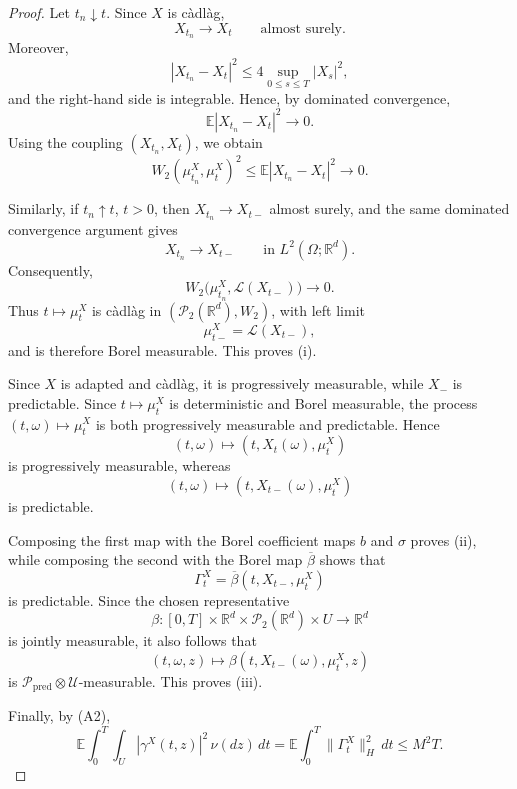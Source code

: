 \documentclass[12pt,oneside, reqno]{amsart}
\numberwithin{equation}{section}
\begin{document}
	\begin{proof}
		Let \(t_n\downarrow t\). Since \(X\) is c\`adl\`ag,
		\[
		X_{t_n}\longrightarrow X_t
		\qquad\text{almost surely}.
		\]
		Moreover,
		\[
		|X_{t_n}-X_t|^2
		\leq
		4\sup_{0\leq s\leq T}|X_s|^2,
		\]
		and the right-hand side is integrable. Hence, by dominated
		convergence,
		\[
		\mathbb E|X_{t_n}-X_t|^2\longrightarrow0.
		\]
		Using the coupling \((X_{t_n},X_t)\), we obtain
		\[
		W_2(\mu_{t_n}^X,\mu_t^X)^2
		\leq
		\mathbb E|X_{t_n}-X_t|^2
		\longrightarrow0.
		\]
		
		Similarly, if \(t_n\uparrow t\), \(t>0\), then
		\(X_{t_n}\to X_{t-}\) almost surely, and the same dominated
		convergence argument gives
		\[
		X_{t_n}\longrightarrow X_{t-}
		\qquad\text{in }L^2(\Omega;\mathbb R^d).
		\]
		Consequently,
		\[
		W_2\bigl(\mu_{t_n}^X,\mathcal L(X_{t-})\bigr)
		\longrightarrow0.
		\]
		Thus \(t\mapsto\mu_t^X\) is c\`adl\`ag in
		\((\mathcal P_2(\mathbb R^d),W_2)\), with left limit
		\[
		\mu_{t-}^X=\mathcal L(X_{t-}),
		\]
		and is therefore Borel measurable. This proves
		\textnormal{(i)}.
		
		Since \(X\) is adapted and c\`adl\`ag, it is progressively
		measurable, while \(X_-\) is predictable. Since
		\(t\mapsto\mu_t^X\) is deterministic and Borel measurable, the
		process \((t,\omega)\mapsto\mu_t^X\) is both progressively
		measurable and predictable. Hence
		\[
		(t,\omega)\longmapsto
		(t,X_t(\omega),\mu_t^X)
		\]
		is progressively measurable, whereas
		\[
		(t,\omega)\longmapsto
		(t,X_{t-}(\omega),\mu_t^X)
		\]
		is predictable.
		
		Composing the first map with the Borel coefficient maps \(b\) and
		\(\sigma\) proves \textnormal{(ii)}, while composing the second with
		the Borel map \(\overline\beta\) shows that
		\[
		\Gamma_t^X
		=
		\overline\beta(t,X_{t-},\mu_t^X)
		\]
		is predictable. Since the chosen representative
		\[
		\beta:
		[0,T]\times\mathbb R^d\times
		\mathcal P_2(\mathbb R^d)\times U
		\longrightarrow\mathbb R^d
		\]
		is jointly measurable, it also follows that
		\[
		(t,\omega,z)
		\longmapsto
		\beta(t,X_{t-}(\omega),\mu_t^X,z)
		\]
		is
		\(\mathcal P_{\mathrm{pred}}\otimes\mathcal U\)-measurable.
		This proves \textnormal{(iii)}.
		
		Finally, by \textnormal{(A2)},
		\[
		\mathbb E\int_0^T\int_U
		|\gamma^X(t,z)|^2\,\nu(dz)\,dt
		=
		\mathbb E\int_0^T
		\|\Gamma_t^X\|_H^2\,dt
		\leq M^2T.
		\]
	\end{proof}
	
\end{document}
